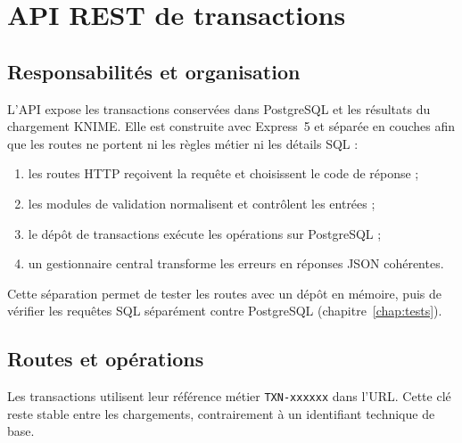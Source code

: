 \chapter{API REST de transactions}\label{chap:api}

\section{Responsabilités et organisation}
L'API expose les transactions conservées dans PostgreSQL et les résultats du chargement KNIME.
Elle est construite avec Express~5 et séparée en couches afin que les routes ne portent ni les
règles métier ni les détails SQL :
\begin{enumerate}
  \item les routes HTTP reçoivent la requête et choisissent le code de réponse ;
  \item les modules de validation normalisent et contrôlent les entrées ;
  \item le dépôt de transactions exécute les opérations sur PostgreSQL ;
  \item un gestionnaire central transforme les erreurs en réponses JSON cohérentes.
\end{enumerate}
Cette séparation permet de tester les routes avec un dépôt en mémoire, puis de vérifier les
requêtes SQL séparément contre PostgreSQL (chapitre~\ref{chap:tests}).

\section{Routes et opérations}
Les transactions utilisent leur référence métier \texttt{TXN-xxxxxx} dans l'URL. Cette clé reste
stable entre les chargements, contrairement à un identifiant technique de base.

